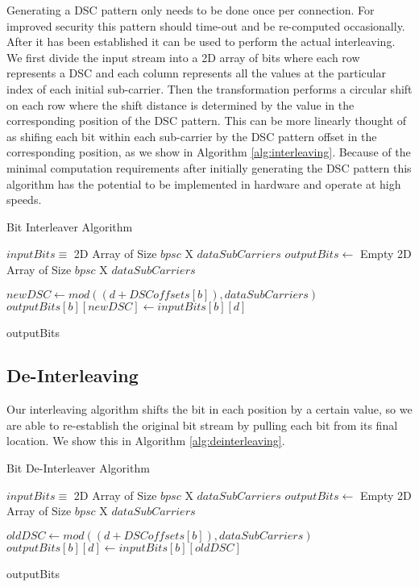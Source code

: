 \documentclass[sigconf]{acmart}
\begin{document}
Generating a DSC pattern only needs to be done once per connection. For improved security this pattern should time-out and be re-computed occasionally. After it has been established it can be used to perform the actual interleaving. We first divide the input stream into a 2D array of bits where each row represents a DSC and each column represents all the values at the particular index of each initial sub-carrier. Then the transformation performs a circular shift on each row where the shift distance is determined by the value in the corresponding position of the DSC pattern. This can be more linearly thought of as shifing each bit within each sub-carrier by the DSC pattern offset in the corresponding position, as we show in Algorithm \ref{alg:interleaving}. Because of the minimal computation requirements after initially generating the DSC pattern this algorithm has the potential to be implemented in hardware and operate at high speeds.

\begin{algorithm}[ht]
\caption{Bit Interleaver Algorithm}
\label{alg:interleaving}
\begin{algorithmic}

\REQUIRE $inputBits \equiv$ 2D Array of Size $bpsc$ X $dataSubCarriers$
\STATE $outputBits \leftarrow $ Empty 2D Array of Size $bpsc$ X $dataSubCarriers$
\STATE

        \STATE $newDSC \leftarrow mod((d + DSCoffsets[b]), dataSubCarriers)$
        \STATE $outputBits[b][newDSC] \leftarrow inputBits[b][d]$
    \ENDFOR
\ENDFOR
\STATE

\RETURN outputBits 
\end{algorithmic}
\end{algorithm}



\subsection{De-Interleaving}
\label{sub:deinterleave}

Our interleaving algorithm shifts the bit in each position by a certain value, so we are able to re-establish the original bit stream by pulling each bit from its final location. We show this in Algorithm \ref{alg:deinterleaving}.

\begin{algorithm}[ht]
\caption{Bit De-Interleaver Algorithm}
\label{alg:deinterleaving}
\begin{algorithmic}

\REQUIRE $inputBits \equiv$ 2D Array of Size $bpsc$ X $dataSubCarriers$
\STATE $outputBits \leftarrow $ Empty 2D Array of Size $bpsc$ X $dataSubCarriers$
\STATE

        \STATE $oldDSC \leftarrow mod((d + DSCoffsets[b]), dataSubCarriers)$
        \STATE $outputBits[b][d] \leftarrow inputBits[b][oldDSC]$
    \ENDFOR
\ENDFOR
\STATE

\RETURN outputBits 
\end{algorithmic}
\end{algorithm}
\end{document}
